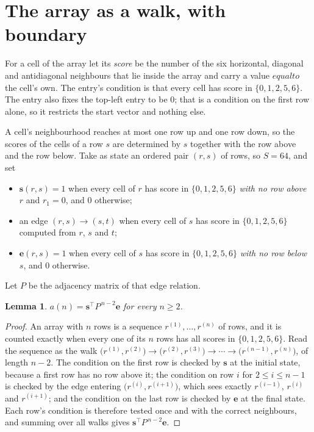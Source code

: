\documentclass[11pt,a4paper]{article}
\theoremstyle{plain}
\newtheorem{lemma}[theorem]{Lemma}
\theoremstyle{definition}
\begin{document}
\section{The array as a walk, with boundary}

For a cell of the array let its \emph{score} be the number of the six horizontal, diagonal and antidiagonal neighbours that lie inside
the array and carry a value $equal to$ the cell's own. The entry's condition is that every cell
has score in $\{0,1,2,5,6\}$. The entry also fixes the top-left entry to be $0$; that is a condition on the first row alone, so it restricts the start vector and nothing else.

A cell's neighbourhood reaches at most one row up and one row down, so the scores of the
cells of a row $s$ are determined by $s$ together with the row above and the row below.
Take as state an ordered pair $(r,s)$ of rows, so $S=64$, and set
\begin{itemize}
\item $\mathbf{s}(r,s)=1$ when every cell of $r$ has score in $\{0,1,2,5,6\}$ \emph{with no row
above $r$} and $r_1=0$, and $0$ otherwise;
\item an edge $(r,s)\to(s,t)$ when every cell of $s$ has score in $\{0,1,2,5,6\}$ computed from
$r$, $s$ and $t$;
\item $\mathbf{e}(r,s)=1$ when every cell of $s$ has score in $\{0,1,2,5,6\}$ \emph{with no row
below $s$}, and $0$ otherwise.
\end{itemize}
Let $P$ be the adjacency matrix of that edge relation.

\begin{lemma}\label{lem:walk}
$a(n)=\mathbf{s}^{\!\top}P^{\,n-2}\mathbf{e}$ for every $n\ge2$.
\end{lemma}

\begin{proof}
An array with $n$ rows is a sequence $r^{(1)},\dots,r^{(n)}$ of rows, and it is counted
exactly when every one of its $n$ rows has all scores in $\{0,1,2,5,6\}$. Read the sequence as the
walk $\bigl(r^{(1)},r^{(2)}\bigr)\to\bigl(r^{(2)},r^{(3)}\bigr)\to\cdots\to
\bigl(r^{(n-1)},r^{(n)}\bigr)$, of length $n-2$. The condition on the first row is
checked by $\mathbf{s}$ at the initial state, because a first row has no row above it; the
condition on row $i$ for $2\le i\le n-1$ is checked by the edge entering
$\bigl(r^{(i)},r^{(i+1)}\bigr)$, which sees exactly $r^{(i-1)}$, $r^{(i)}$ and
$r^{(i+1)}$; and the condition on the last row is checked by $\mathbf{e}$ at the final
state. Each row's condition is therefore tested once and with the correct neighbours, and
summing over all walks gives $\mathbf{s}^{\!\top}P^{\,n-2}\mathbf{e}$.
\end{proof}
\end{document}
